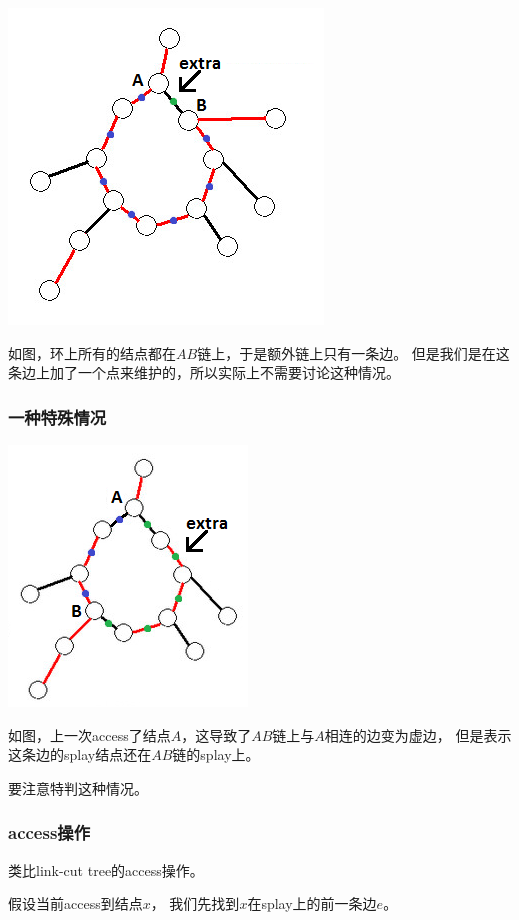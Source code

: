 \documentclass{noithesis}
\begin{document}
\includegraphics{images/lcc-cycle-2.png}

如图，环上所有的结点都在$A B$链上，于是额外链上只有一条边。
但是我们是在这条边上加了一个点来维护的，所以实际上不需要讨论这种情况。

\subsubsection{一种特殊情况}

\includegraphics{images/lcc-2b-0.png}

如图，上一次access了结点$A$，这导致了$A B$链上与$A$相连的边变为虚边，
但是表示这条边的splay结点还在$A B$链的splay上。

要注意特判这种情况。




\subsubsection{access操作}

类比link-cut tree的access操作。

假设当前access到结点$x$，
我们先找到$x$在splay上的前一条边$e$。
\end{document}
